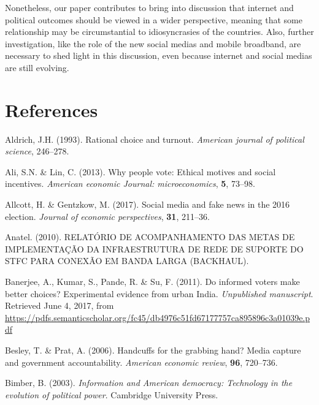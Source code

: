 \documentclass[
  12pt,
]{article}
\begin{document}
Nonetheless, our paper contributes to bring into discussion that
internet and political outcomes should be viewed in a wider perspective,
meaning that some relationship may be circumstantial to idiosyncrasies
of the countries. Also, further investigation, like the role of the new
social medias and mobile broadband, are necessary to shed light in this
discussion, even because internet and social medias are still evolving.

\hypertarget{references}{%
\section*{References}\label{references}}

\hypertarget{refs}{}
\leavevmode\hypertarget{ref-aldrich_rational_1993}{}%
Aldrich, J.H. (1993). Rational choice and turnout. \emph{American
journal of political science}, 246--278.

\leavevmode\hypertarget{ref-ali_why_2013}{}%
Ali, S.N. \& Lin, C. (2013). Why people vote: Ethical motives and social
incentives. \emph{American economic Journal: microeconomics},
\textbf{5}, 73--98.

\leavevmode\hypertarget{ref-allcott_social_2017}{}%
Allcott, H. \& Gentzkow, M. (2017). Social media and fake news in the
2016 election. \emph{Journal of economic perspectives}, \textbf{31},
211--36.

\leavevmode\hypertarget{ref-anatel_relatorio_2010}{}%
Anatel. (2010). RELATÓRIO DE ACOMPANHAMENTO DAS METAS DE IMPLEMENTAÇÃO
DA INFRAESTRUTURA DE REDE DE SUPORTE DO STFC PARA CONEXÃO EM BANDA LARGA
(BACKHAUL).

\leavevmode\hypertarget{ref-banerjee_informed_2011}{}%
Banerjee, A., Kumar, S., Pande, R. \& Su, F. (2011). Do informed voters
make better choices? Experimental evidence from urban India.
\emph{Unpublished manuscript}. Retrieved June 4, 2017, from
\url{https://pdfs.semanticscholar.org/fc45/db4976c51fd67177757ca895896c3a01039e.pdf}

\leavevmode\hypertarget{ref-besley_handcuffs_2006}{}%
Besley, T. \& Prat, A. (2006). Handcuffs for the grabbing hand? Media
capture and government accountability. \emph{American economic review},
\textbf{96}, 720--736.

\leavevmode\hypertarget{ref-bimber_information_2003}{}%
Bimber, B. (2003). \emph{Information and American democracy: Technology
in the evolution of political power}. Cambridge University Press.
\end{document}

